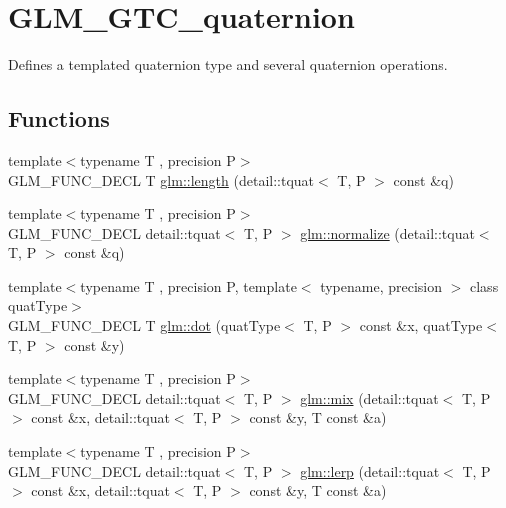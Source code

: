 \hypertarget{group__gtc__quaternion}{}\section{G\+L\+M\+\_\+\+G\+T\+C\+\_\+quaternion}
\label{group__gtc__quaternion}


Defines a templated quaternion type and several quaternion operations.  


\subsection*{Functions}
\begin{DoxyCompactItemize}
\item 
{\footnotesize template$<$typename T , precision P$>$ }\\G\+L\+M\+\_\+\+F\+U\+N\+C\+\_\+\+D\+E\+CL T \hyperlink{group__gtc__quaternion_ga3406ab83e2cafd4034f359957e942410}{glm\+::length} (detail\+::tquat$<$ T, P $>$ const \&q)
\item 
{\footnotesize template$<$typename T , precision P$>$ }\\G\+L\+M\+\_\+\+F\+U\+N\+C\+\_\+\+D\+E\+CL detail\+::tquat$<$ T, P $>$ \hyperlink{group__gtc__quaternion_ga34ee289ca53a08207904e935104715d8}{glm\+::normalize} (detail\+::tquat$<$ T, P $>$ const \&q)
\item 
{\footnotesize template$<$typename T , precision P, template$<$ typename, precision $>$ class quat\+Type$>$ }\\G\+L\+M\+\_\+\+F\+U\+N\+C\+\_\+\+D\+E\+CL T \hyperlink{group__gtc__quaternion_gac54dfc83de465a2d03e90d342242ab3d}{glm\+::dot} (quat\+Type$<$ T, P $>$ const \&x, quat\+Type$<$ T, P $>$ const \&y)
\item 
{\footnotesize template$<$typename T , precision P$>$ }\\G\+L\+M\+\_\+\+F\+U\+N\+C\+\_\+\+D\+E\+CL detail\+::tquat$<$ T, P $>$ \hyperlink{group__gtc__quaternion_gafabf175ae3e2cd30bf58dc313321955a}{glm\+::mix} (detail\+::tquat$<$ T, P $>$ const \&x, detail\+::tquat$<$ T, P $>$ const \&y, T const \&a)
\item 
{\footnotesize template$<$typename T , precision P$>$ }\\G\+L\+M\+\_\+\+F\+U\+N\+C\+\_\+\+D\+E\+CL detail\+::tquat$<$ T, P $>$ \hyperlink{group__gtc__quaternion_gafc1c989eaa2c786d34218b176f680fe0}{glm\+::lerp} (detail\+::tquat$<$ T, P $>$ const \&x, detail\+::tquat$<$ T, P $>$ const \&y, T const \&a)
\item 

\end{DoxyCompactItemize}
